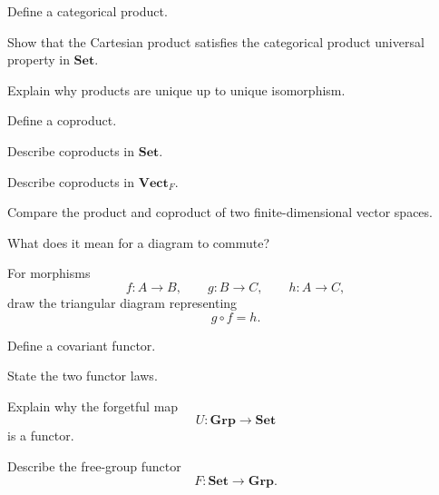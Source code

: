 \begin{exercise}[1]
Define a categorical product.
\end{exercise}

\begin{exercise}[2]
Show that the Cartesian product satisfies the categorical product universal
property in \(\mathbf{Set}\).
\end{exercise}

\begin{exercise}[2]
Explain why products are unique up to unique isomorphism.
\end{exercise}

\begin{exercise}[1]
Define a coproduct.
\end{exercise}

\begin{exercise}[2]
Describe coproducts in \(\mathbf{Set}\).
\end{exercise}

\begin{exercise}[2]
Describe coproducts in \(\mathbf{Vect}_F\).
\end{exercise}

\begin{exercise}[2]
Compare the product and coproduct of two finite-dimensional vector spaces.
\end{exercise}

\begin{exercise}[1]
What does it mean for a diagram to commute?
\end{exercise}

\begin{exercise}[2]
For morphisms
\[ f:A\to B,\qquad g:B\to C,\qquad h:A\to C, \]
draw the triangular diagram representing
\[ g\circ f=h. \]
\end{exercise}

\begin{exercise}[1]
Define a covariant functor.
\end{exercise}

\begin{exercise}[1]
State the two functor laws.
\end{exercise}

\begin{exercise}[2]
Explain why the forgetful map
\[ U:\mathbf{Grp}\to\mathbf{Set} \]
is a functor.
\end{exercise}

\begin{exercise}[2]
Describe the free-group functor
\[ F:\mathbf{Set}\to\mathbf{Grp}. \]
\end{exercise}

